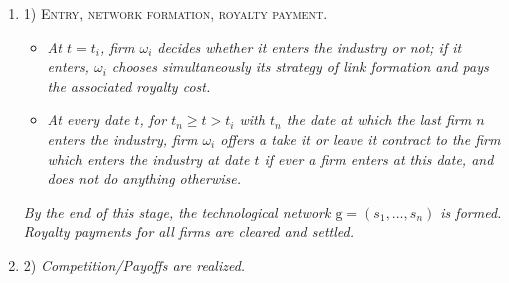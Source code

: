 \documentclass{article}
\begin{document}
\begin{enumerate}
    \item[] \textsc{1) Entry, network formation, royalty payment.}
\begin{itemize}
\item  \textit{At $t=t_i$, firm $\omega_i$ decides whether it enters the industry or not; if it enters, $\omega_i$ chooses simultaneously its strategy of link formation and pays the associated royalty cost. }
\item \textit{At every date $t$, for $t_n \geq t>t_i$ with $t_n$ the date at which the last firm $n$ enters the industry, firm $\omega_i$ offers a take it or leave it contract to the firm which enters the industry at date $t$ if ever a firm enters at this date, and does not do anything otherwise. }
  \end{itemize}
\textit{By the end of this stage, the technological network $\text{g}=(s_1,\ldots,s_n)$ is formed. Royalty payments for all firms are cleared and settled.}
    \item[] \textsc{2)} \textit{Competition/Payoffs are realized.}

\end{enumerate}  
\end{document}
